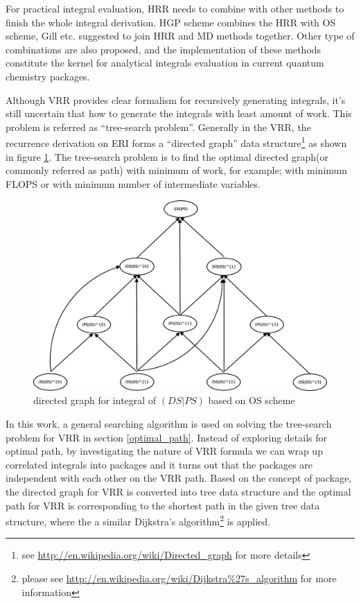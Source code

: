 For practical integral evaluation, HRR needs to combine with other
methods to finish the whole integral derivation. HGP\cite{HGP} scheme combines the HRR with OS scheme,
Gill etc. \cite{gill1989efficient, gill1990efficient}suggested to join HRR and MD methods together. 
Other type of combinations are also proposed\cite{lindh1991reduced,new_hrr_Schaefer}, and
the implementation of these methods\cite{gill1994molecular} constitute the kernel for analytical 
integrals evaluation in current quantum chemistry packages.

Although VRR provides clear formalism for recursively generating integrals, it's still 
uncertain that how to generate the integrals with least amount of work. This problem is 
referred as ``tree-search problem''\cite{HGP}. Generally in the VRR, the recurrence derivation on 
ERI forms a ``directed graph'' data structure\footnote{see 
\url{http://en.wikipedia.org/wiki/Directed_graph} for more details} as shown in figure \ref{fig:1}. The 
tree-search problem is to find the optimal directed graph(or commonly referred as path) with 
minimum of work, for example; with minimum FLOPS or with minimum number of intermediate variables. 

 \begin{figure}[htb]
 \centering
 \includegraphics[scale=0.25]{./graph.eps}
 \caption{directed graph for integral of $(DS|PS)$ based on OS scheme}
 \label{fig:1}
\end{figure}

In this work, a general searching algorithm is used on solving the tree-search problem for 
VRR in section \ref{optimal_path}. Instead of exploring details for optimal path, by
investigating the nature of VRR formula we can wrap up correlated integrals into packages
and it turns out that the packages are independent with each other on the VRR path. Based on
the concept of package, the directed graph for VRR is converted into tree data structure and the optimal
path for VRR is corresponding to the shortest path in the given tree data structure, where the
a similar Dijkstra's algorithm\footnote{please see 
\url{http://en.wikipedia.org/wiki/Dijkstra\%27s_algorithm} for more information} is applied.

